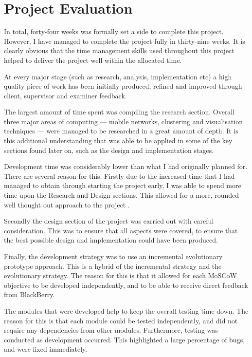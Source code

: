 \section{Project Evaluation}
\label{sec:project_evaluation}

In total, forty-four weeks was formally set a side to complete this project.
However, I have managed to complete the project fully in thirty-nine weeks. It 
is clearly obvious that the time management skills used throughout this project 
helped to deliver the project well within the allocated time.

At every major stage (such as research, analysis, implementation etc) a high 
quality piece of work has been initially produced, refined and improved through
client, supervisor and examiner feedback.

The largest amount of time spent was compiling the research section. Overall 
three major areas of computing --- mobile networks, clustering and 
visualisation techniques --- were managed to be researched in a great amount 
of depth. It is this additional understanding that was able to be applied in 
some of the key sections found later on, such as the design and implementation 
stages.

Development time was considerably lower than what I had originally planned for.
There are several reason for this. Firstly due to the increased time that I had
managed to obtain through starting the project early, I was able to spend more 
time upon the Research and Design sections. This allowed for a more, rounded
well thought out approach to the project .

Secondly the design section of the project was carried out with careful 
consideration. This was to ensure that all aspects were covered, to ensure that
the best possible design and implementation could have been produced.

Finally, the development strategy was to use an incremental evolutionary 
prototype approach. This is a hybrid of the incremental strategy and the 
evolutionary strategy. The reason for this is that it allowed for each MoSCoW 
objective to be developed independently, and to be able to receive direct 
feedback from BlackBerry.

The modules that were developed help to keep the overall testing time down. The
reason for this is that each module could be tested independently, and did not
require any dependencies from other modules. Furthermore, testing was conducted
as development occurred. This highlighted a large percentage of bugs, and were 
fixed immediately.

